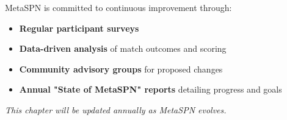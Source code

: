 MetaSPN is committed to continuous improvement through:
\begin{itemize}[leftmargin=*]
  \item \textbf{Regular participant surveys}
  \item \textbf{Data-driven analysis} of match outcomes and scoring
  \item \textbf{Community advisory groups} for proposed changes
  \item \textbf{Annual "State of MetaSPN" reports} detailing progress and goals
\end{itemize}

\vspace{1em}

\begin{center}
\large\textit{This chapter will be updated annually as MetaSPN evolves.}
\end{center}


